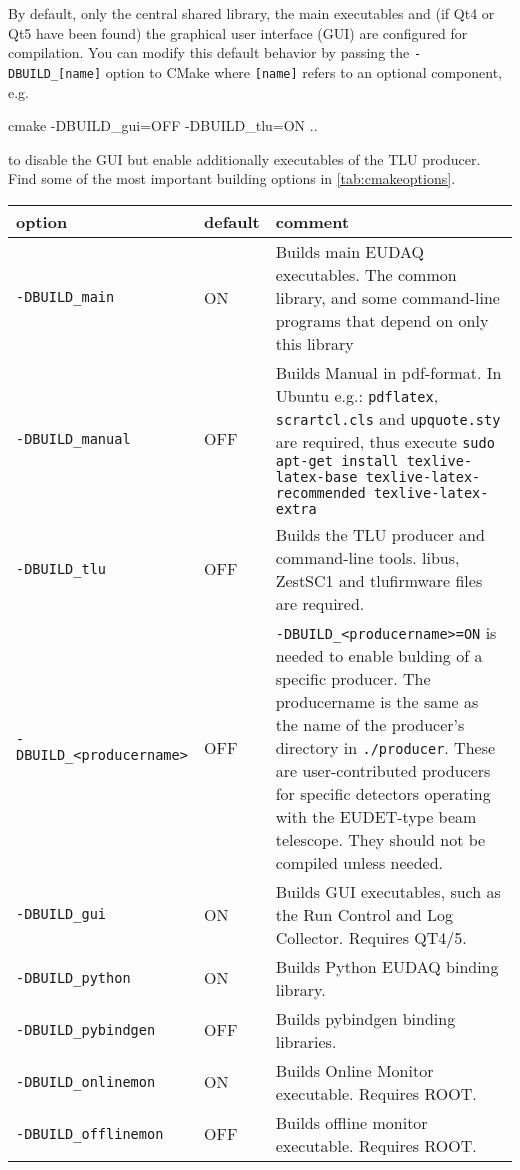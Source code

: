 By default, only the central shared library, the main executables and (if Qt4 or Qt5 have been found) the graphical user interface (GUI) are configured for compilation. 
You can modify this default behavior by passing the \texttt{-DBUILD\_[name]} option to
CMake where \texttt{[name]} refers to an optional component, e.g.
\begin{listing}[mybash]
cmake -DBUILD_gui=OFF -DBUILD_tlu=ON ..
\end{listing}
to disable the GUI but enable additionally executables of the TLU producer.
Find some of the most important building options in \autoref{tab:cmakeoptions}.

\begin{table}[!h]
{\footnotesize
\begin{tabular}{l|l|p{9.5cm}}
option &  default &  comment \\
\hline
\texttt{-DBUILD\_main} &  ON & Builds main EUDAQ executables.
The common library, and some command-line programs that depend on only this library \\
\texttt{-DBUILD\_manual} & OFF &  Builds Manual in pdf-format. In Ubuntu e.g.: \texttt{pdflatex}, \texttt{scrartcl.cls} and \texttt{upquote.sty} are required, thus execute \texttt{sudo apt-get install texlive-latex-base texlive-latex-recommended texlive-latex-extra} \\
\texttt{-DBUILD\_tlu} &  OFF &  Builds the TLU producer and command-line tools. libus, ZestSC1 and tlufirmware files are required. \\
\texttt{-DBUILD\_<producername>} &  OFF &  \texttt{-DBUILD\_<producername>=ON} is needed to enable bulding of a specific producer. 
The producername is the same as the name of the producer's directory in \texttt{./producer}. 
These are user-contributed producers for specific detectors operating with the EUDET-type beam telescope. They should not be compiled unless needed.\\
\texttt{-DBUILD\_gui} &  ON & Builds GUI executables, such as the Run Control and Log Collector. Requires QT4/5. \\
\texttt{-DBUILD\_python} & ON & Builds Python EUDAQ binding library. \\
\texttt{-DBUILD\_pybindgen} &  OFF &  Builds pybindgen binding libraries. \\
\texttt{-DBUILD\_onlinemon} &  ON & Builds Online Monitor executable. Requires ROOT. \\
\texttt{-DBUILD\_offlinemon} & OFF &  Builds offline monitor executable. Requires ROOT. \\

\end{tabular}}
\end{table}
